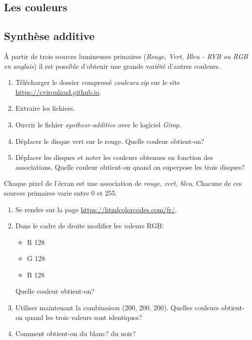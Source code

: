 \documentclass[a4paper,11pt]{article}
\begin{document}
\begin{Form}
\section{Les couleurs}
\subsection{Synthèse additive}
À partir de trois sources lumineuses primaires (\emph{Rouge, Vert, Bleu - RVB ou RGB en anglais}) il est possible d'obtenir une grande variété d'autres couleurs.
\begin{activite}
\begin{enumerate}
\item Télécharger le dossier compressé \emph{couleurs.zip} sur le site \mbox{\url{https://cviroulaud.github.io}}.
\item Extraire les fichiers.
\item Ouvrir le fichier \emph{synthese-additive} avec le logiciel \emph{Gimp}.
\item Déplacer le disque vert sur le rouge. Quelle couleur obtient-on?
\item Déplacer les disques et noter les couleurs obtenues en fonction des associations. Quelle couleur obtient-on quand on superpose les trois disques?
\end{enumerate}
\end{activite}
\begin{aretenir}[]
Chaque pixel de l'écran est une association de \emph{rouge, vert, bleu}. Chacune de ces sources primaires varie entre 0 et 255.
\end{aretenir}
\begin{activite}
\begin{enumerate}
\item Se rendre sur la page \url{https://htmlcolorcodes.com/fr/}.
\item Dans le cadre de droite modifier les valeurs RGB:
\begin{itemize}
\item R 128
\item G 128
\item B 128
\end{itemize}
Quelle couleur obtient-on?
\item Utiliser maintenant la combinaison (200, 200, 200). Quelles couleurs obtient-on quand les trois valeurs sont identiques?
\item Comment obtient-on du blanc? du noir?
\end{enumerate}
\end{activite}

\end{Form}
\end{document}
